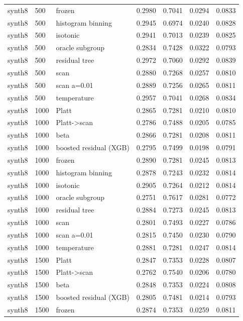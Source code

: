 \begin{tabular}{lllrrrr}
synth8 & 500 & frozen & 0.2980 & 0.7041 & 0.0294 & 0.0833 \\
synth8 & 500 & histogram binning & 0.2945 & 0.6974 & 0.0240 & 0.0828 \\
synth8 & 500 & isotonic & 0.2941 & 0.7013 & 0.0239 & 0.0825 \\
synth8 & 500 & oracle subgroup & 0.2834 & 0.7428 & 0.0322 & 0.0793 \\
synth8 & 500 & residual tree & 0.2972 & 0.7060 & 0.0292 & 0.0839 \\
synth8 & 500 & scan & 0.2880 & 0.7268 & 0.0257 & 0.0810 \\
synth8 & 500 & scan a=0.01 & 0.2889 & 0.7256 & 0.0265 & 0.0811 \\
synth8 & 500 & temperature & 0.2957 & 0.7041 & 0.0268 & 0.0834 \\
synth8 & 1000 & Platt & 0.2865 & 0.7281 & 0.0210 & 0.0810 \\
synth8 & 1000 & Platt->scan & 0.2786 & 0.7488 & 0.0205 & 0.0785 \\
synth8 & 1000 & beta & 0.2866 & 0.7281 & 0.0208 & 0.0811 \\
synth8 & 1000 & boosted residual (XGB) & 0.2795 & 0.7499 & 0.0198 & 0.0791 \\
synth8 & 1000 & frozen & 0.2890 & 0.7281 & 0.0245 & 0.0813 \\
synth8 & 1000 & histogram binning & 0.2878 & 0.7243 & 0.0232 & 0.0814 \\
synth8 & 1000 & isotonic & 0.2905 & 0.7264 & 0.0212 & 0.0814 \\
synth8 & 1000 & oracle subgroup & 0.2751 & 0.7617 & 0.0281 & 0.0772 \\
synth8 & 1000 & residual tree & 0.2884 & 0.7273 & 0.0245 & 0.0813 \\
synth8 & 1000 & scan & 0.2801 & 0.7493 & 0.0227 & 0.0786 \\
synth8 & 1000 & scan a=0.01 & 0.2815 & 0.7450 & 0.0230 & 0.0790 \\
synth8 & 1000 & temperature & 0.2881 & 0.7281 & 0.0247 & 0.0814 \\
synth8 & 1500 & Platt & 0.2847 & 0.7353 & 0.0228 & 0.0807 \\
synth8 & 1500 & Platt->scan & 0.2762 & 0.7540 & 0.0206 & 0.0780 \\
synth8 & 1500 & beta & 0.2848 & 0.7353 & 0.0224 & 0.0808 \\
synth8 & 1500 & boosted residual (XGB) & 0.2805 & 0.7481 & 0.0214 & 0.0793 \\
synth8 & 1500 & frozen & 0.2874 & 0.7353 & 0.0259 & 0.0811 \\

\end{tabular}
